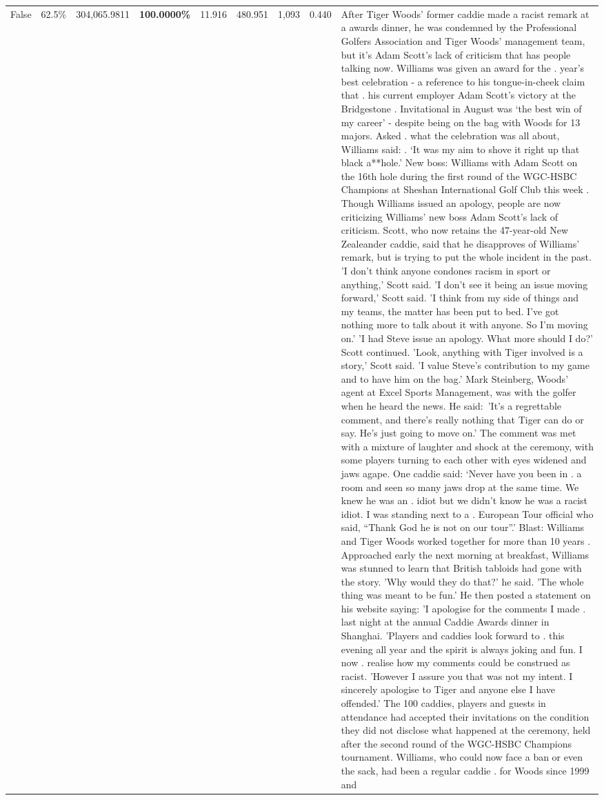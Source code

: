 \begin{table}[H]
\begin{tabular}{lllrlllll}
False & 62.5\% & 304,065.9811 & \bfseries \color{red} 100.0000\% & 11.916 & 480.951 & 1,093 & 0.440 & After Tiger Woods' former caddie made a racist remark at a awards dinner, he was condemned by the Professional Golfers Association and Tiger Woods' management team, but it's Adam Scott's lack of criticism that has people talking now. Williams was given an award for the . year’s best celebration - a reference to his tongue-in-cheek claim that . his current employer Adam Scott’s victory at the Bridgestone . Invitational in August was ‘the best win of my career’ - despite being on the bag with Woods for 13 majors. Asked . what the celebration was all about, Williams said: . ‘It was my aim to shove it right up that black a**hole.’ New boss: Williams with Adam Scott  on the 16th hole during the first round of the WGC-HSBC Champions at Sheshan International Golf Club this week . Though Williams issued an apology, people are now criticizing Williams' new boss Adam Scott's lack of criticism. Scott, who now retains the 47-year-old New Zealeander caddie, said that he disapproves of Williams' remark, but is trying to put the whole incident in the past. 'I don't think anyone condones racism in sport or anything,' Scott said. 'I don't see it being an issue moving forward,' Scott said. 'I think from my side of things and my teams, the matter has been put to bed. I've got nothing more to talk about it with anyone. So I'm moving on.' 'I had Steve issue an apology. What more should I do?' Scott continued. 'Look, anything with Tiger involved is a story,' Scott said. 'I value Steve's contribution to my game and to have him on the bag.' Mark Steinberg, Woods' agent at Excel Sports Management, was with the golfer when he heard the news. He said: 'It's a regrettable comment, and there's really nothing that Tiger can do or say. He's just going to move on.' The comment was met with a mixture of laughter and shock at the ceremony, with some players turning to each other with eyes widened and jaws agape. One caddie said: ‘Never have you been in . a room and seen so many jaws drop at the same time. We knew he was an . idiot but we didn’t know he was a racist idiot. I was standing next to a . European Tour official who said, “Thank God he is not on our tour”.’ Blast: Williams and Tiger Woods worked together for more than 10 years . Approached early the next morning at breakfast, Williams was stunned to learn that British tabloids had gone with the story. 'Why would they do that?' he said. 'The whole thing was meant to be fun.' He then posted a statement on his website saying: 'I apologise for the comments I made . last night at the annual Caddie Awards dinner in Shanghai. 'Players and caddies look forward to . this evening all year and the spirit is always joking and fun. I now . realise how my comments could be construed as racist. 'However I assure you that was not my intent. I sincerely apologise to Tiger and anyone else I have offended.' The 100 caddies, players and guests in attendance had accepted their invitations on the condition they did not disclose what happened at the ceremony, held after the second round of the WGC-HSBC Champions tournament. Williams, who could now face a ban or even the sack, had been a regular caddie . for Woods since 1999 and 
\end{tabular}
\end{table}
